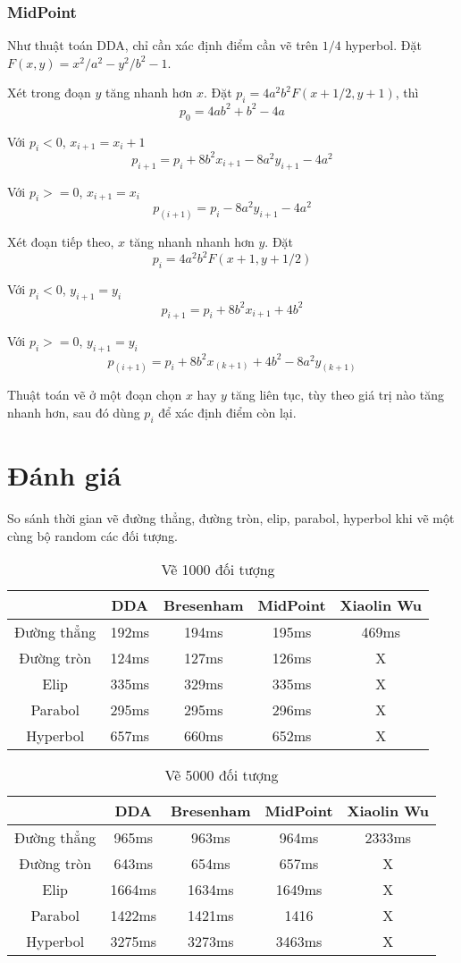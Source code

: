 \documentclass[12pt]{article}
\begin{document}
\subsubsection{MidPoint}
Như thuật toán DDA, chỉ cần xác định điểm cần vẽ trên \(1/4\) hyperbol.
Đặt \(F(x, y) = x^2/a^2 - y^2/b^2 - 1\).

Xét trong đoạn \(y\) tăng nhanh hơn \(x\).
Đặt \(p_i = 4a^2 b^2 F(x + 1/2, y + 1)\), thì
\[p_0 = 4ab^2 + b^2 - 4a\]

Với \(p_i < 0\), \(x_{i+1} = x_i + 1\)
\[p_{i+1} = p_i + 8b^2 x_{i+1} - 8a^2 y_{i+1} - 4a^2\]

Với \(p_i >= 0\), \(x_{i+1} = x_i\)
\[p_(i+1) = p_i - 8a^2 y_{i+1} - 4a^2\]

Xét đoạn tiếp theo, \(x\) tăng nhanh nhanh hơn \(y\).
Đặt \[p_i = 4a^2 b^2 F(x + 1, y + 1/2)\]

Với \(p_i < 0\), \(y_{i+1} = y_i\)
\[p_{i+1} = p_i + 8b^2 x_{i+1} + 4b^2\]

Với \(p_i >= 0\), \(y_{i+1} = y_i\)
\[p_(i+1) = p_i + 8b^2 x_(k+1) + 4b^2 - 8a^2 y_(k+1)\]

Thuật toán vẽ ở một đoạn chọn \(x\) hay \(y\) tăng liên tục,
tùy theo giá trị nào tăng nhanh hơn,
sau đó dùng \(p_i\) để xác định điểm còn lại.

\section{Đánh giá}
So sánh thời gian vẽ đường thẳng, đường tròn, elip, parabol, hyperbol
khi vẽ một cùng bộ random các đối tượng.

\begin{table}[H]
\begin{tabular}{| c || c | c | c | c |}
\hline
& DDA & Bresenham & MidPoint & Xiaolin Wu \\
\hline \hline
Đường thẳng & 192ms & 194ms & 195ms & 469ms \\
\hline
Đường tròn & 124ms & 127ms & 126ms & X \\
\hline
Elip & 335ms & 329ms & 335ms & X \\
\hline
Parabol & 295ms & 295ms & 296ms & X \\
\hline
Hyperbol & 657ms & 660ms & 652ms & X \\
\hline
\end{tabular}
\caption{Vẽ 1000 đối tượng}
\end{table}

\begin{table}[H]
\begin{tabular}{| c || c | c | c | c |}
\hline
& DDA & Bresenham & MidPoint & Xiaolin Wu \\
\hline \hline
Đường thẳng & 965ms & 963ms & 964ms & 2333ms \\
\hline
Đường tròn & 643ms & 654ms & 657ms & X \\
\hline
Elip & 1664ms & 1634ms & 1649ms & X \\
\hline
Parabol & 1422ms & 1421ms & 1416 & X \\
\hline
Hyperbol & 3275ms & 3273ms & 3463ms & X \\
\hline
\end{tabular}
\caption{Vẽ 5000 đối tượng}
\end{table}
\end{document}

